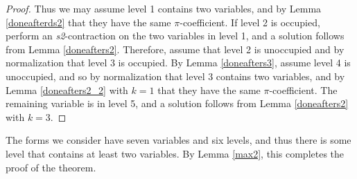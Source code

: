 \documentclass[draft]{publmathdeb}
\begin{document}
\begin{proof}
Thus we may assume level 1 contains two variables, and by Lemma \ref{doneafterds2} that they have the same $\pi$-coefficient.  If level 2 is occupied, perform an \textit{s2}-contraction on the two variables in level 1, and a solution follows from Lemma \ref{doneafters2}.  Therefore, assume that level 2 is unoccupied and by normalization that level 3 is occupied.  By Lemma \ref{doneafters3}, assume level 4 is unoccupied, and so by normalization that level 3 contains two variables, and by Lemma \ref{doneafters2_2} with $k=1$ that they have the same $\pi$-coefficient.  The remaining variable is in level 5, and a solution follows from Lemma \ref{doneafters2} with $k=3$.
\end{proof}

The forms we consider have seven variables and six levels, and thus there is some level that contains at least two variables.  By Lemma \ref{max2}, this completes the proof of the theorem.



\end{document}
